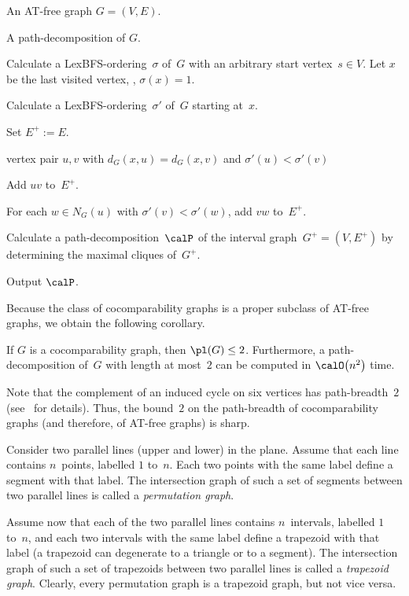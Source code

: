 \begin{algorithm}
    [htb]
    \caption
    {%
        Computes a path-decomposition of length at most~$2$ for a given AT-free graph.
    }
    \label{algo:ATfreeDeco}

\KwIn
{%
    An AT-free graph $G = (V, E)$.
}

\KwOut
{%
    A path-decomposition of $G$.
}

Calculate a LexBFS-ordering~$\sigma$ of~$G$ with an arbitrary start vertex~$s \in V$.
Let $x$ be the last visited vertex, \ie, $\sigma(x) = 1$.

Calculate a LexBFS-ordering~$\sigma'$ of~$G$ starting at~$x$.

Set $E^+ := E$.

\ForEach
{%
    vertex pair $u, v$ with $d_G(x,u) = d_G(x,v)$ and $\sigma'(u) < \sigma'(v)$
}
{%
    Add $uv$ to~$E^+$.

    For each $w \in N_G(u)$ with $\sigma'(v) < \sigma'(w)$, add $vw$ to~$E^+$.%
}

Calculate a path-decomposition~$\calP$ of the interval graph~$G^+ = (V, E^+)$ by determining the maximal cliques of~$G^+$.

Output $\calP$.
\end{algorithm}

Because the class of cocomparability graphs is a proper subclass of AT-free graphs, we obtain the following corollary.

\begin{corollary}
    \label{cor:plCocompGr}
If \( G \) is a cocomparability graph, then \( \pl(G) \leq 2 \).
Furthermore, a path-decomposition of~\( G \) with length at most~\( 2 \) can be computed in \( \calO \big( n^2 \big) \) time.
\end{corollary}

Note that the complement of an induced cycle on six vertices has path-breadth~$2$ (see~\cite{DragKoehLeit2017} for details).
Thus, the bound~$2$ on the path-breadth of cocomparability graphs (and therefore, of AT-free graphs) is sharp.


Consider two parallel lines (upper and lower) in the plane.
Assume that each line contains $n$~points, labelled $1$ to~$n$.
Each two points with the same label define a segment with that label.
The intersection graph of such a set of segments between two parallel lines is called a \emph{permutation graph}.

Assume now that each of the two parallel lines contains $n$~intervals, labelled $1$ to~$n$, and each two intervals with the same label define a trapezoid with that label (a trapezoid can degenerate to a triangle or to a segment).
The intersection graph of such a set of trapezoids between two parallel lines is called a \emph{trapezoid graph}.
Clearly, every permutation graph is a trapezoid graph, but not vice versa.

